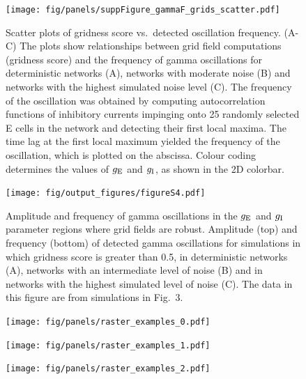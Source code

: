 \documentclass[a4paper,12pt]{article}
\newcommand{\ssc}[3]{\ensuremath{#1_{\text{#2}_{\text{#3}}}}}
\newcommand{\gE      }{\ssc{g}      {\scriptsize{E}}{}}
\newcommand{\gI      }{\ssc{g}      {\scriptsize{I}}{}}
\begin{document}
\clearpage

\begin{figure}[ht!]
    \centering
        \texttt{[image: fig/panels/suppFigure\_gammaF\_grids\_scatter.pdf]}
    \caption{Scatter plots of gridness score vs.\ detected oscillation
    frequency.  (A-C) The plots show relationships between grid field
    computations (gridness score) and the frequency of gamma oscillations for
    deterministic networks (A), networks with moderate noise (B) and networks
    with the highest simulated noise level (C).  The frequency of the
    oscillation was obtained by computing autocorrelation functions of
    inhibitory currents impinging onto 25 randomly selected E cells in the
    network and detecting their first local maxima.  The time lag at the first
    local maximum yielded the frequency of the oscillation, which is plotted on
    the abscissa. Colour coding determines the values of $\gE$ and $\gI$, as
    shown in the 2D colorbar.}
\end{figure}

\clearpage

\begin{figure}[p]
    \centering
        \texttt{[image: fig/output\_figures/figureS4.pdf]}
    \caption{Amplitude and frequency of gamma oscillations in the $\gE$ and
    $\gI$ parameter regions where grid fields are robust. Amplitude (top) and
    frequency (bottom) of detected gamma oscillations for simulations in which
    gridness score is greater than 0.5, in deterministic networks (A), networks
    with an intermediate level of noise (B) and in networks with the highest
    simulated level of noise (C). The data in this figure are from simulations
    in Fig.~3.}
\end{figure}

\clearpage

\begin{figure}[p]
    \centering
        \texttt{[image: fig/panels/raster\_examples\_0.pdf]}
\end{figure}

\begin{figure}[p]
    \centering
        \texttt{[image: fig/panels/raster\_examples\_1.pdf]}
\end{figure}

\begin{figure}[p]
    \centering
        \texttt{[image: fig/panels/raster\_examples\_2.pdf]}
\end{figure}

\clearpage
\end{document}
